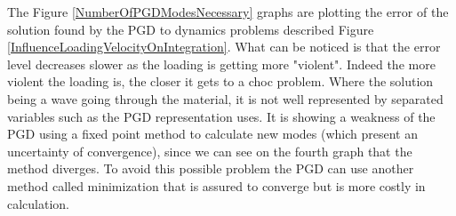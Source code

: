 \documentclass[12pt,a4paper]{article}
\begin{document}
The Figure \ref{NumberOfPGDModesNecessary} graphs are plotting the error of the solution found by the PGD to dynamics problems described Figure \ref{InfluenceLoadingVelocityOnIntegration}. What can be noticed is that the error level decreases slower as the loading is getting more "violent". Indeed the more violent the loading is, the closer it gets to a choc problem. Where the solution being a wave going through the material, it is not well represented by separated variables such as the PGD representation uses. It is showing a weakness of the PGD using a fixed point method to calculate new modes (which present an uncertainty of convergence), since we can see on the fourth graph that the method diverges. To avoid this possible problem the PGD can use another method called minimization \cite{nouy2010priori} that is assured to converge but is more costly in calculation.
\end{document}
